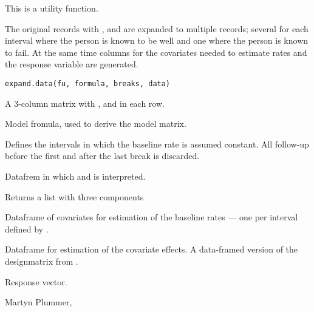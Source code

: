 \begin{Description}\relax
This is a utility function.

The original records with ,  and
 are
expanded to multiple records; several for each interval where the
person is known to be well and one where the person is known to fail.
At the same time columns for the covariates needed to estimate rates
and the response variable are generated.
\end{Description}
\begin{Usage}
\begin{verbatim}
expand.data(fu, formula, breaks, data)
\end{verbatim}
\end{Usage}
\begin{Arguments}
\begin{ldescription}
\item[\code{fu}] A 3-column matrix with ,  and
 in each row.
\item[\code{formula}] Model fromula, used to derive the model matrix.
\item[\code{breaks}] Defines the intervals in which the baseline rate is
assumed constant. All follow-up before the first and after the
last break is discarded.
\item[\code{data}] Datafrem in which  and  is interpreted.
\end{ldescription}
\end{Arguments}
\begin{Value}
Returns a list with three components
\begin{ldescription}
\item[\code{rates.frame}] Dataframe of covariates for estimation of the
baseline rates --- one per interval defined by .
\item[\code{cov.frame}] Dataframe for estimation of the covariate effects. A
data-framed version of the designmatrix from .
\item[\code{y}] Response vector.
\end{ldescription}
\end{Value}
\begin{Author}\relax
Martyn Plummer, 
\end{Author}
